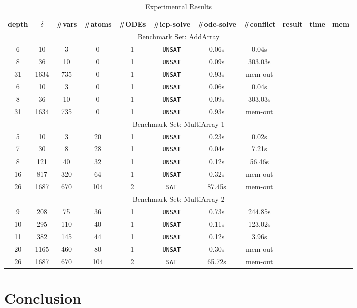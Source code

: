 \documentclass[envcountsect]{llncs}
\begin{document}
\begin{center}
\begin{table}[h]
\centering
\begin{tabular}{||c|c|| c| c| c||c|c|c||c|c|c||}
\hline
depth & $\delta$ & \#vars  &\#atoms &\#ODEs &\#icp-solve &
\#ode-solve& \#conflict & result & time & mem \\
\hline
\multicolumn{11}{|c|}{Benchmark Set: AddArray} \\
\hline
 6 & 10 & 3 & 0  & 1& {\tt UNSAT}& 0.06s &0.04s\\
 8 & 36 & 10 & 0 & 1 &{\tt UNSAT}& 0.09s &303.03s \\
 31 & 1634 & 735 & 0 & 1& {\tt UNSAT}& 0.93s & mem-out \\
 6 & 10 & 3 & 0  & 1& {\tt UNSAT}& 0.06s &0.04s\\
 8 & 36 & 10 & 0 & 1 &{\tt UNSAT}& 0.09s &303.03s \\
 31 & 1634 & 735 & 0 & 1& {\tt UNSAT}& 0.93s & mem-out \\
\hline
\multicolumn{11}{|c|}{Benchmark Set: MultiArray-1} \\
\hline
 5 & 10 & 3 & 20 & 1&{\tt UNSAT}& 0.23s  & 0.02s   \\
 7 & 30 & 8 & 28 & 1 &{\tt UNSAT}& 0.04s & 7.21s   \\
 8 & 121 & 40 & 32 &1 &{\tt UNSAT}& 0.12s & 56.46s   \\
 16 & 817 & 320 & 64 & 1 &{\tt UNSAT}& 0.32s  & mem-out\\
26 & 1687 & 670 & 104 & 2 &{\tt SAT} & 87.45s & mem-out\\
\hline
\multicolumn{11}{|c|}{Benchmark Set: MultiArray-2} \\
\hline
 9 & 208 & 75 & 36 & 1 &{\tt UNSAT}& 0.73s & 244.85s \\
 10 & 295 & 110 & 40 & 1 &{\tt UNSAT}& 0.11s & 123.02s \\
 11 & 382 & 145 & 44 & 1 &{\tt UNSAT}& 0.12s & 3.96s \\
 20 & 1165 & 460 & 80 & 1 &{\tt UNSAT}& 0.30s & mem-out  \\
26 & 1687 & 670 & 104 & 2 &{\tt SAT} & 65.72s & mem-out \\
\hline
\end{tabular}
\caption{Experimental Results}
\end{table}
\end{center}

\section{Conclusion}
\end{document}
